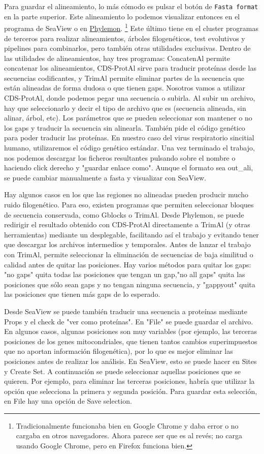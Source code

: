 Para guardar el alineamiento, lo más cómodo es pulsar el botón de \texttt{Fasta format} en la parte superior. Este alineamiento lo podemos visualizar entonces en el programa de SeaView o en \href{http://phylemon.bioinfo.cipf.es/}{Phylemon}. \footnote{Tradicionalmente funcionaba bien en Google Chrome y daba error o no cargaba en otros navegadores. Ahora parece ser que es al revés; no carga usando Google Chrome, pero en Firefox funciona bien.} Este último tiene en el cluster programas de terceros para realizar alineamientos, árboles filogenéticos, test evolutivos y pipelines para combinarlos, pero también otras utilidades exclusivas. Dentro de las utilidades de alineamientos, hay tres programas: ConcatenAl permite concatenar los alineamientos, CDS-ProtAl sirve para traducir proteínas desde las secuencias codificantes, y TrimAl permite eliminar partes de la secuencia que están alineadas de forma dudosa o que tienen gaps. Nosotros vamos a utilizar CDS-ProtAl, donde podemos pegar una secuencia o subirla. Al subir un archivo, hay que seleccionarlo y decir el tipo de archivo que es (secuencia alineada, sin alinar, árbol, etc). Los parámetros que se pueden seleccionar son mantener o no los gaps y traducir la secuencia sin alinearla. También pide el código genético para poder traducir las proteínas. En nuestro caso del virus respiratorio sincitial humano, utilizaremos el código genético estándar. Una vez terminado el trabajo, nos podemos descargar los ficheros resultantes pulsando sobre el nombre o haciendo click derecho y "guardar enlace como". Aunque el formato sea out\_ali, se puede cambiar manualmente a fasta y visualizar con SeaView. 

Hay algunos casos en los que las regiones no alineadas pueden producir mucho ruido filogenético. Para eso, existen programas que permiten seleccionar bloques de secuencia conservada, como Gblocks o TrimAl. Desde Phylemon, se puede redirigir el resultado obtenido con CDS-ProtAl directamente a TrimAl (y otras herramientas) mediante un desplegable, facilitando así el trabajo y evitando tener que descargar los archivos intermedios y temporales. Antes de lanzar el trabajo con TrimAl, permite seleccionar la eliminación de secuencias de baja similitud o calidad antes de quitar las posiciones. Hay varios métodos para quitar los gaps: "no gaps" quita todas las posiciones que tengan un gap,"no all gaps" quita las posiciones que sólo sean gaps y no tengan ninguna secuencia, y "gappyout" quita las posiciones que tienen más gaps de lo esperado. 

Desde SeaView se puede también traducir una secuencia a proteínas mediante Props y el check de "ver como proteínas". En "File" se puede guardar el archivo. En algunos casos, algunas posiciones son muy variables (por ejemplo, las terceras posiciones de los genes mitocondriales, que tienen tantos cambios superimpuestos que no aportan información filogenética), por lo que es mejor eliminar las posiciones antes de realizar los análisis. En SeaView, esto se puede hacer en Sites y Create Set. A continuación se puede seleccionar aquellas posiciones que se quieren. Por ejemplo, para eliminar las terceras posiciones, habría que utilizar la opción que selecciona la primera y segunda posición. Para guardar esta selección, en File hay una opción de Save selection.

